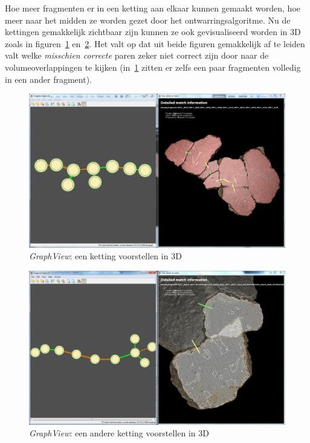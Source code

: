 Hoe meer fragmenten er in een ketting aan elkaar kunnen gemaakt worden, hoe meer naar het midden ze worden gezet door het ontwarringsalgoritme. Nu de kettingen gemakkelijk zichtbaar zijn kunnen ze ook gevisualiseerd worden in 3D zoals in figuren~\ref{fig:graphchain1} en~\ref{fig:graphchain2}. Het valt op dat uit beide figuren gemakkelijk af te leiden valt welke \emph{misschien correcte} paren zeker niet correct zijn door naar de volumeoverlappingen te kijken (in~\ref{fig:graphchain1} zitten er zelfs een paar fragmenten volledig in een ander fragment).

\begin{figure}[ht]
	\begin{center}
		\includegraphics[width=1.0\columnwidth]{images/detailview-chain-02-rawcut.png}
		\caption{\emph{GraphView}: een ketting voorstellen in 3D}
		\label{fig:graphchain1}
	\end{center}
\end{figure}

\begin{figure}[ht]
	\begin{center}
		\includegraphics[width=1.0\columnwidth]{images/detailview-chain-10-rawcut.png}
		\caption{\emph{GraphView}: een andere ketting voorstellen in 3D}
		\label{fig:graphchain2}
	\end{center}
\end{figure}